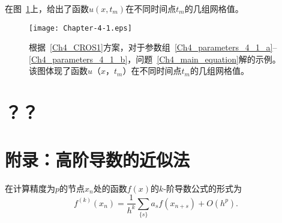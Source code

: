 \documentclass[twoside]{book}
\begin{document}
\begin{CJK*}{GBK}{song}
在图~\ref{Fig_4_1}上，给出了函数$u(x,t_m)$在不同时间点$t_m$的几组网格值。

\begin{figure}[t]
	\centering
	\texttt{[image: Chapter-4-1.eps]}\\
	\caption{根据~\eqref{Ch4_CROS1}方案，对于参数组~\eqref{Ch4_parameters_4_1_a}--\eqref{Ch4_parameters_4_1_b}，问题~\eqref{Ch4_main_equation}解的示例。该图体现了函数$ u（x，t_m）$在不同时间点$ t_m $的几组网格值。}
	\label{Fig_4_1}
\end{figure}




	
\section{？？}




	
\section{附录：高阶导数的近似法}\label{Appendix_4_a}

在计算精度为$p$的节点$x_n$处的函数$f(x)$的$k$-阶导数公式的形式为
\begin{equation}
\label{Ch4_3_general_finite-difference_formula}
f^{(k)}(x_n) = \dfrac{1}{h^k}\sum\limits_{\{s\}} a_s f(x_{n + s}) + O(h^p).
\end{equation}


\end{CJK*}
\end{document}
